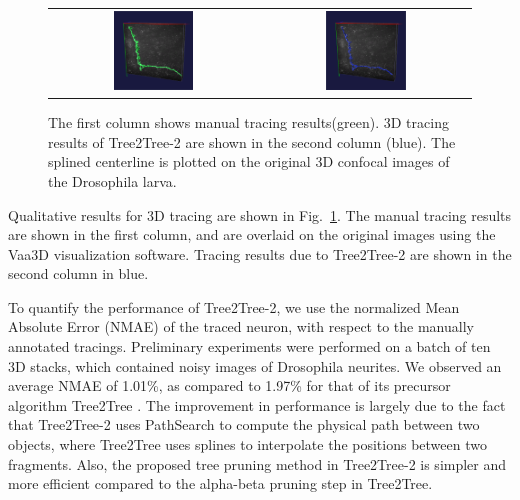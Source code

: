 \begin{figure}[t]
\begin{tabular}{cc}
\includegraphics[width=0.4\textwidth]{images/ch3/T2T2_3D3_orig}	&
\includegraphics[width=0.4\textwidth]{images/ch3/T2T2_3D3}	
\end{tabular}
\caption[Tree2Tree-2: 3D results]{The first column shows manual tracing results(green). 3D tracing results of Tree2Tree-2 are shown in the second column (blue). The splined centerline is plotted on the original 3D confocal images of the Drosophila larva.}
\label{fig:T2T2_results3D}
\end{figure}
Qualitative results for 3D tracing are shown in Fig.~\ref{fig:T2T2_results3D}. The manual tracing results are shown in the first column, and are overlaid on the original images using the Vaa3D visualization software\cite{peng_v3d}. Tracing results due to Tree2Tree-2 are shown in the second column in blue. 

To quantify the performance of Tree2Tree-2, we use the normalized Mean Absolute Error (NMAE)\cite{basu_T2T_journal} of the traced neuron, with respect to the manually annotated tracings. Preliminary experiments were performed on a batch of ten 3D stacks, which contained noisy images of Drosophila neurites. We observed an average NMAE of 1.01\%, as compared to 1.97\% for that of its precursor algorithm Tree2Tree \cite{basu_T2T_journal}. The improvement in performance is largely due to the fact that Tree2Tree-2 uses PathSearch to compute the physical path between two objects, where Tree2Tree uses splines to interpolate the positions between two fragments. Also, the proposed tree pruning method in Tree2Tree-2 is simpler and more efficient compared to the alpha-beta pruning step in Tree2Tree.
\clearpage
